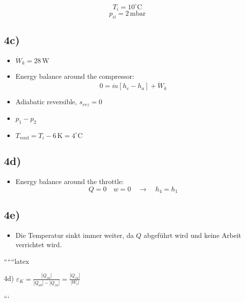\[
T_i = 10^\circ \text{C}
\]
\[
p_{ii} = 2 \, \text{mbar}
\]

\subsection*{4c)}

\begin{itemize}
    \item \( \dot{W}_k = 28 \, \text{W} \)
    \item Energy balance around the compressor:
    \[
    0 = \dot{m} \left[ h_e - h_a \right] + \dot{W}_k
    \]
    \item Adiabatic reversible, \( s_{erz} = 0 \)
    \item \( p_1 - p_2 \)
    \item \( T_{\text{verd}} = T_i - 6 \, \text{K} = 4^\circ \text{C} \)
\end{itemize}

\subsection*{4d)}

\begin{itemize}
    \item Energy balance around the throttle:
    \[
    Q = 0 \quad w = 0 \quad \rightarrow \quad h_4 = h_1
    \]
\end{itemize}

\subsection*{4e)}

\begin{itemize}
    \item Die Temperatur sinkt immer weiter, da \( Q \) abgeführt wird und keine Arbeit verrichtet wird.
\end{itemize}

``````latex


4d) \(\varepsilon_K = \frac{|Q_{zu}|}{|Q_{ab}| - |Q_{zu}|} = \frac{|Q_{zu}|}{|W_{t}|}\)

```
